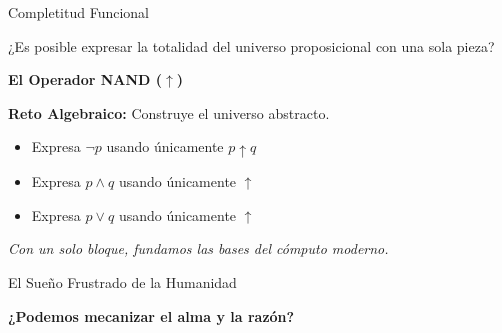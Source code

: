 \documentclass[10pt, aspectratio=169]{beamer}
\begin{document}
\begin{frame}{Completitud Funcional}
    \begin{center}
        \Large
        ¿Es posible expresar la totalidad del universo proposicional con una sola pieza?
        
        \vspace{0.5cm}
        \alert{\textbf{El Operador NAND ($\uparrow$)}}
    \end{center}
    
    \vspace{0.5cm}
    \textbf{Reto Algebraico:} Construye el universo abstracto.
    \begin{itemize}
        \item Expresa $\neg p$ usando únicamente $p \uparrow q$
        \item Expresa $p \land q$ usando únicamente $\uparrow$
        \item Expresa $p \lor q$ usando únicamente $\uparrow$
    \end{itemize}
    
    \vspace{0.5cm}
    \begin{center}
        \textit{Con un solo bloque, fundamos las bases del cómputo moderno.}
    \end{center}
\end{frame}
\begin{frame}{El Sueño Frustrado de la Humanidad}
    \begin{center}
        \Large \textbf{¿Podemos mecanizar el alma y la razón?}
    \end{center}

\end{frame}
\end{document}
